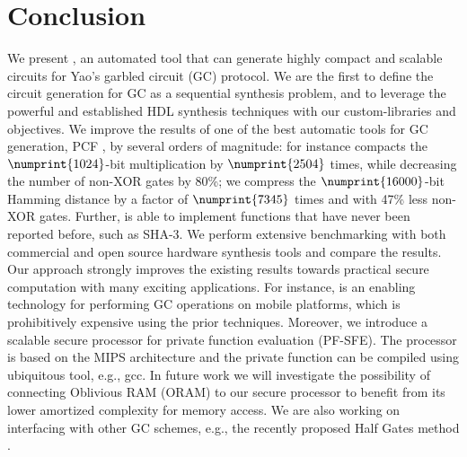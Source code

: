 \chapter{Conclusion}
We present \sys{}, an automated tool that can generate highly compact and scalable circuits for Yao's garbled circuit (GC) protocol.
We are the first to define the circuit generation for GC as a sequential synthesis problem, and to leverage the powerful and established HDL synthesis techniques with our custom-libraries and objectives.
We improve the results of one of the best automatic tools for GC generation, PCF \cite{kreuter2013pcf}, by several orders of magnitude: for instance \sys{} compacts the $\numprint{1024}$-bit multiplication by $\numprint{2504}$ times, while decreasing the number of non-XOR gates by 80\%; we compress the $\numprint{16000}$-bit Hamming distance by a factor of $\numprint{7345}$ times and with 47\% less non-XOR gates.
Further, \sys{} is able to implement functions that have never been reported before, such as SHA-3.
We perform extensive benchmarking with both commercial and open source hardware synthesis tools and compare the results.
Our approach strongly improves the existing results towards practical secure computation with many exciting applications.
For instance, \sys{} is an enabling technology for performing GC operations on mobile platforms, which is prohibitively expensive using the prior techniques.
Moreover, we introduce a scalable secure processor for private function evaluation (PF-SFE).
The processor is based on the MIPS architecture and the private function can be compiled using ubiquitous tool, e.g., gcc.
In future work we will investigate the possibility of connecting Oblivious RAM (ORAM) to our secure processor to benefit from its lower amortized complexity for memory access.
We are also working on interfacing \sys{} with other GC schemes, e.g., the recently proposed Half Gates method \cite{zahur2015two}.
